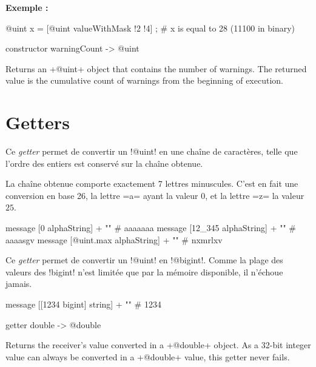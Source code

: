 \textbf{Exemple :}
\begin{galgas}
@uint x = [@uint valueWithMask !2 !4] ; # x is equal to 28 (11100 in binary)
\end{galgas}





\begin{galgas}
constructor warningCount -> @uint
\end{galgas}


Returns an \ggs+@uint+ object that contains the number of warnings. The returned value is the cumulative count of warnings from the beginning of execution.

\section{Getters}


Ce \emph{getter} permet de convertir un \ggs!@uint! en une chaîne de caractères, telle que l'ordre des entiers est conservé sur la chaîne obtenue.

La chaîne obtenue comporte exactement 7 lettres minuscules. C'est en fait une conversion en base 26, la lettre \ggs=a= ayant la valeur $0$, et la lettre \ggs=z= la valeur $25$.


\begin{galgas}
  message [0 alphaString] + "\n"         # aaaaaaa
  message [12_345 alphaString] + "\n"    # aaaasgv
  message [@uint.max alphaString] + "\n" # nxmrlxv
\end{galgas}




Ce \emph{getter} permet de convertir un \ggs!@uint! en \ggs!@bigint!. Comme la plage des valeurs des \ggs!bigint! n'est limitée que par la mémoire disponible, il n'échoue jamais.

\begin{galgas}
  message [[1234 bigint] string] + "\n" # 1234
\end{galgas}



\begin{galgas}
getter double -> @double
\end{galgas}

Returns the receiver's value converted in a \ggs+@double+ object. As a 32-bit integer value can always be converted in a \ggs+@double+ value, this getter never fails.



